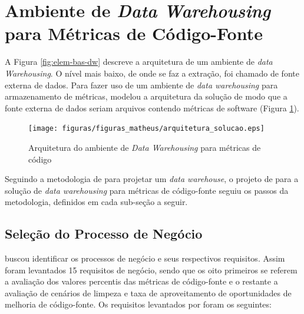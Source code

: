 \section{Ambiente de \textit{Data Warehousing} para Métricas de Código-Fonte}

A Figura \ref{fig:elem-bas-dw} descreve a arquitetura de um ambiente de \textit{data Warehousing}. O nível mais baixo, de onde se faz a extração, foi chamado de fonte externa de dados. Para fazer uso de um ambiente de \textit{data warehousing} para armazenamento de métricas,  modelou a arquitetura da solução de modo que a fonte externa de dados seriam arquivos contendo métricas de software (Figura \ref{fig:arquitetura_solucao}).

\begin{figure}[h!]
\centering
\texttt{[image: figuras/figuras\_matheus/arquitetura\_solucao.eps]}
\caption{Arquitetura do ambiente de \textit{Data Warehousing} para métricas de código}
\label{fig:arquitetura_solucao}
\end{figure}
\FloatBarrier

Seguindo a metodologia de  para projetar um \textit{data warehouse}, o projeto de  para a solução de \textit{data warehousing} para métricas de código-fonte seguiu os passos da metodologia, definidos em cada sub-seção a seguir.

\subsection{Seleção do Processo de Negócio}

 buscou identificar os processos de negócio e seus respectivos requisitos. Assim foram levantados 15 requisitos de negócio, sendo que os oito primeiros se referem a avaliação dos valores percentis das métricas de código-fonte e o restante a avaliação de cenários de limpeza e taxa de aproveitamento de oportunidades de melhoria de código-fonte. Os requisitos levantados por  foram os seguintes:

